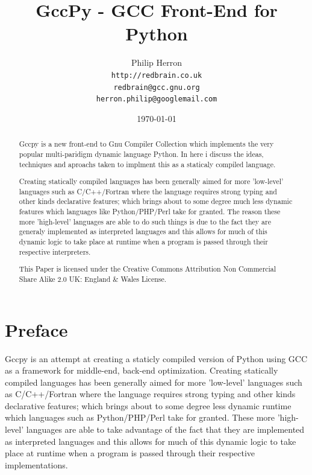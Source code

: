 \documentclass[defaultstyle,11pt]{article}
\begin{document}
\renewcommand\floatpagefraction{.9}
\renewcommand\topfraction{.9}
\renewcommand\bottomfraction{.9}
\renewcommand\textfraction{.1}   
\setcounter{totalnumber}{50}
\setcounter{topnumber}{50}
\setcounter{bottomnumber}{50}

\title{GccPy - GCC Front-End for Python}
\author{Philip Herron\\
  \texttt{http://redbrain.co.uk}\\
  \texttt{redbrain@gcc.gnu.org} \\
  \texttt{herron.philip@googlemail.com}\\
\byncsa}
\date{\today}
\maketitle
\begin{abstract}
Gccpy is a new front-end to Gnu Compiler Collection which implements the
very popular multi-paridigm dynamic language Python. In here i discuss the
ideas, techniques and aproachs taken to implment this as a staticaly compiled
language.

Creating statically compiled languages has
been generally aimed for more 'low-level' languages such as C/C++/Fortran where the language requires
strong typing and other kinds declarative features; which brings about to some degree much less dynamic
features which languages like Python/PHP/Perl take for granted. The reason these more 'high-level' 
languages are able to do such things is due to the fact they are generaly implemented as interpreted
languages and this allows for much of this dynamic logic to take place at runtime when a program is passed
through their respective interpreters.

This Paper is licensed under the Creative Commons Attribution Non Commercial Share Alike 2.0 UK: England \& Wales License.
\end{abstract}

\newpage

\tableofcontents
\listoffigures
\lstlistoflistings
\printnomenclature[2.5cm]

\section{Preface}
Gccpy is an attempt at creating a staticly compiled version of Python using GCC as a framework for
middle-end, back-end optimization. Creating statically compiled languages has
been generally aimed for more 'low-level' languages such as C/C++/Fortran where the language requires
strong typing and other kinds declarative features; which brings about to some degree less dynamic
runtime which languages such as Python/PHP/Perl take for granted. These more 'high-level' 
languages are able to take advantage of the fact that they are implemented as interpreted
languages and this allows for much of this dynamic logic to take place at runtime when a program is passed
through their respective implementations.
\end{document}

